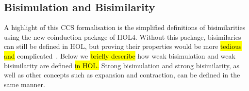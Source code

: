 
\subsection{Bisimulation and Bisimilarity}
\label{ss:bb}

A highlight of this CCS formalisation is the simplified definitions of
bisimilarities using the new coinduction package of
HOL4. Without this package, bisimilaries can still be defined in HOL, but
proving their properties would be more \hl{tedious and}
complicated~\citep[p.~91]{Mil89}.
Below we \hl{briefly describe} how weak bisimulation and weak
bisimilarity are defined \hl{in HOL.}
Strong bisimulation and strong bisimilarity, as well as other
concepts such as expansion and contraction, can be defined
in the same manner.

